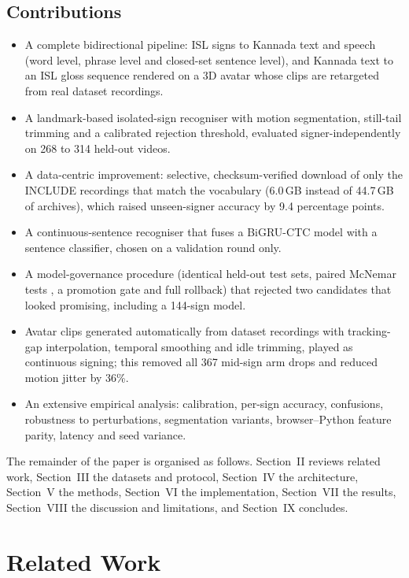 \documentclass[conference]{IEEEtran}
\begin{document}
\subsection{Contributions}
\begin{itemize}
\item A complete bidirectional pipeline: ISL signs to Kannada text and speech (word level, phrase level and closed-set sentence level), and Kannada text to an ISL gloss sequence rendered on a 3D avatar whose clips are retargeted from real dataset recordings.
\item A landmark-based isolated-sign recogniser with motion segmentation, still-tail trimming and a calibrated rejection threshold, evaluated signer-independently on 268 to 314 held-out videos.
\item A data-centric improvement: selective, checksum-verified download of only the INCLUDE \cite{sridhar2020include} recordings that match the vocabulary (6.0\,GB instead of 44.7\,GB of archives), which raised unseen-signer accuracy by 9.4 percentage points.
\item A continuous-sentence recogniser that fuses a BiGRU-CTC model \cite{graves2006ctc} with a sentence classifier, chosen on a validation round only.
\item A model-governance procedure (identical held-out test sets, paired McNemar tests \cite{mcnemar1947}, a promotion gate and full rollback) that rejected two candidates that looked promising, including a 144-sign model.
\item Avatar clips generated automatically from dataset recordings with tracking-gap interpolation, temporal smoothing and idle trimming, played as continuous signing; this removed all 367 mid-sign arm drops and reduced motion jitter by 36\%.
\item An extensive empirical analysis: calibration, per-sign accuracy, confusions, robustness to perturbations, segmentation variants, browser--Python feature parity, latency and seed variance.
\end{itemize}

The remainder of the paper is organised as follows. Section~II reviews related work, Section~III the datasets and protocol, Section~IV the architecture, Section~V the methods, Section~VI the implementation, Section~VII the results, Section~VIII the discussion and limitations, and Section~IX concludes.

\section{Related Work}
\end{document}
